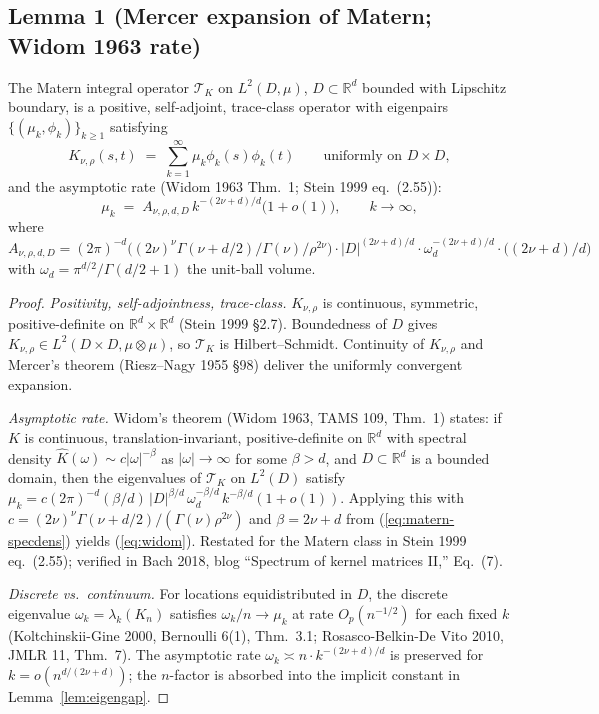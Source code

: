 
\subsection*{Lemma 1 (Mercer expansion of Matern; Widom 1963 rate)}

\begin{lemma}\label{lem:matern-mercer}
The Matern integral operator $\mathcal{T}_K$ on $L^2(D,\mu)$, $D\subset\mathbb{R}^d$
bounded with Lipschitz boundary, is a positive, self-adjoint, trace-class operator
with eigenpairs $\{(\mu_k,\phi_k)\}_{k\ge1}$ satisfying
\[
K_{\nu,\rho}(s,t)\;=\;\sum_{k=1}^\infty\mu_k\phi_k(s)\phi_k(t)
   \qquad\text{uniformly on }D\times D,
\]
and the asymptotic rate (Widom 1963 Thm.~1; Stein 1999 eq.~(2.55)):
\begin{equation}\label{eq:widom}
\mu_k \;=\; A_{\nu,\rho,d,D}\,k^{-(2\nu+d)/d}\bigl(1+o(1)\bigr),\qquad k\to\infty,
\end{equation}
where $A_{\nu,\rho,d,D}=(2\pi)^{-d}\bigl((2\nu)^\nu\Gamma(\nu+d/2)/\Gamma(\nu)/\rho^{2\nu}\bigr)
\cdot |D|^{(2\nu+d)/d}\cdot\omega_d^{-(2\nu+d)/d}\cdot\bigl((2\nu+d)/d\bigr)$
with $\omega_d=\pi^{d/2}/\Gamma(d/2+1)$ the unit-ball volume.
\end{lemma}

\begin{proof}
\emph{Positivity, self-adjointness, trace-class.} $K_{\nu,\rho}$ is continuous,
symmetric, positive-definite on $\mathbb{R}^d\times\mathbb{R}^d$ (Stein 1999
\S2.7). Boundedness of $D$ gives $K_{\nu,\rho}\in L^2(D\times D,\mu\otimes\mu)$,
so $\mathcal T_K$ is Hilbert--Schmidt. Continuity of $K_{\nu,\rho}$ and Mercer's
theorem (Riesz--Nagy 1955 \S98) deliver the uniformly convergent expansion.

\emph{Asymptotic rate.} Widom's theorem (Widom 1963, TAMS 109, Thm.~1) states:
if $K$ is continuous, translation-invariant, positive-definite on $\mathbb{R}^d$
with spectral density $\widehat K(\omega)\sim c|\omega|^{-\beta}$ as
$|\omega|\to\infty$ for some $\beta>d$, and $D\subset\mathbb{R}^d$ is a bounded
domain, then the eigenvalues of $\mathcal T_K$ on $L^2(D)$ satisfy
$\mu_k=c(2\pi)^{-d}(\beta/d)\,|D|^{\beta/d}\,\omega_d^{-\beta/d}\,k^{-\beta/d}(1+o(1))$.
Applying this with $c=(2\nu)^\nu\Gamma(\nu+d/2)/(\Gamma(\nu)\rho^{2\nu})$ and
$\beta=2\nu+d$ from (\ref{eq:matern-specdens}) yields (\ref{eq:widom}). Restated
for the Matern class in Stein 1999 eq.~(2.55); verified in Bach 2018, blog
``Spectrum of kernel matrices II,'' Eq.~(7).

\emph{Discrete vs.\ continuum.} For locations equidistributed in $D$, the
discrete eigenvalue $\omega_k=\lambda_k(K_n)$ satisfies $\omega_k/n\to\mu_k$ at
rate $O_p(n^{-1/2})$ for each fixed $k$ (Koltchinskii-Gine 2000, Bernoulli
6(1), Thm.~3.1; Rosasco-Belkin-De Vito 2010, JMLR 11, Thm.~7). The asymptotic
rate $\omega_k\asymp n\cdot k^{-(2\nu+d)/d}$ is preserved for
$k=o(n^{d/(2\nu+d)})$; the $n$-factor is absorbed into the implicit constant
in Lemma~\ref{lem:eigengap}.
\end{proof}

